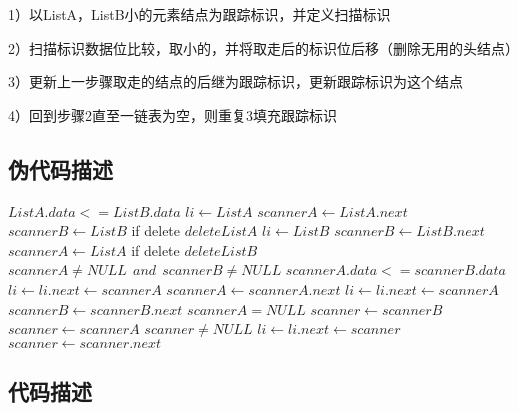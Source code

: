 \documentclass{article}
\begin{document}
1）以ListA，ListB小的元素结点为跟踪标识，并定义扫描标识\par
2）扫描标识数据位比较，取小的，并将取走后的标识位后移（删除无用的头结点）\par
3）更新上一步骤取走的结点的后继为跟踪标识，更新跟踪标识为这个结点\par
4）回到步骤2直至一链表为空，则重复3填充跟踪标识

\subsection{伪代码描述}



\begin{codebox}

\li \If $ ListA.data <= ListB.data $
\li 	\Then 
\li 		$ li \gets ListA$
\li 		$ scannerA \gets ListA.next $
\li 		$ scannerB \gets ListB $
\li 		\Comment if delete 
\li 		$ delete ListA$		
\li 	\Else
\li 		$ li \gets ListB $
\li 		$ scannerB \gets ListB.next $
\li 		$ scannerA \gets ListA $
\li 		\Comment if delete 
\li 		$ delete ListB$		
	\End
\li \While $ scannerA \neq NULL\ \ and \ \ scannerB \neq NULL $
\li 	\Do
\li 	\If $ scannerA.data <= scannerB.data $
\li 		\Then 
\li 			$ li \gets li.next \gets scannerA $
\li 			$ scannerA \gets scannerA.next $
\li 		\Else
\li 			$ li \gets li.next \gets scannerA  $
\li 			$ scannerB \gets scannerB.next $
		\End
	\End
\li \If $ scannerA = NULL $
\li 	\Then 
\li 		$ scanner \gets scannerB $
\li 	\Else
\li 		$ scanner \gets scannerA $
	\End	
\li \While $ scanner \neq NULL $
\li 	\Do
\li 		$ li \gets li.next \gets scanner $
\li 		$ scanner \gets scanner.next $
\end{codebox}



\subsection{代码描述}
\end{document}
